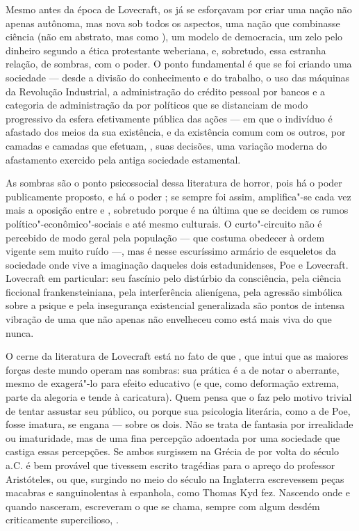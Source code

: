 Mesmo antes da época de Lovecraft, os  já se esforçavam por criar uma nação não apenas autônoma, mas nova sob todos os aspectos, uma nação que
combinasse ciência (não em abstrato, mas como {}),
um modelo de democracia, um
zelo pelo dinheiro segundo a ética protestante weberiana, e, sobretudo, essa estranha relação, de sombras, com o
poder. O ponto fundamental é que se foi criando uma sociedade --- desde
a divisão do conhecimento e do trabalho, o uso das máquinas da Revolução
Industrial, a administração do crédito pessoal por bancos e a categoria
de administração da {} por políticos que se distanciam
de modo progressivo da esfera efetivamente pública das ações --- em que
o indivíduo é afastado dos meios da sua existência, e da existência
comum com os outros, por camadas e camadas que efetuam, {}, suas decisões, uma variação moderna do
afastamento exercido pela antiga sociedade estamental.

As sombras são o ponto psicossocial dessa literatura de horror, pois há o poder publicamente proposto, e há o
poder {}; se sempre foi assim, amplifica"-se cada vez mais a oposição entre
{} e {}, sobretudo porque é
na última que se decidem os rumos político"-econômico"-sociais e até mesmo
culturais. O curto"-circuito não é percebido de modo geral pela população
--- que costuma obedecer à ordem vigente sem muito ruído ---, mas é
nesse escuríssimo armário de esqueletos da sociedade onde vive a
imaginação daqueles dois estadunidenses, Poe e Lovecraft. Lovecraft em
particular: seu fascínio pelo distúrbio da consciência, pela ciência
ficcional frankensteiniana, pela interferência alienígena, pela agressão
simbólica sobre a psique e pela insegurança existencial generalizada são
pontos de intensa vibração de uma {} que não apenas não
envelheceu como está mais viva do que nunca.

O cerne da literatura de Lovecraft está no fato de que {},
que intui que as maiores forças deste mundo operam nas sombras: sua prática é a de
notar o aberrante, mesmo de exagerá"-lo para efeito educativo (e que,
como deformação extrema, parte da alegoria e tende à caricatura). Quem
pensa que o faz pelo motivo trivial de tentar assustar seu público, ou
porque sua psicologia literária, como a de Poe, fosse imatura, se engana
--- sobre os dois. Não se trata de fantasia por irrealidade ou
imaturidade, mas de uma fina percepção adoentada por uma sociedade que
castiga essas percepções. Se ambos surgissem na Grécia de por volta do
século  a.C. é bem provável que tivessem escrito tragédias para o
apreço do professor Aristóteles, ou que, surgindo no meio do século 
na Inglaterra escrevessem peças macabras e sanguinolentas à espanhola,
como Thomas Kyd fez. Nascendo onde e quando nasceram, escreveram o que
se chama, sempre com algum desdém criticamente supercilioso,
{}.

